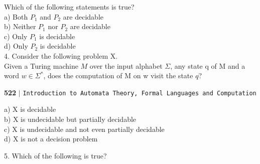 \documentclass[11pt]{article}
\begin{document}
\vspace*{0.1cm}
\hspace*{0.5cm} Which of the following statements is true?\\

\vspace*{0.1cm}
\hspace*{0.5cm} a) Both $P _{1}$ and $P _{2}$ are decidable\\
\hspace*{0.5cm} b) Neither $P _{1}$ nor $P _{2}$ are decidable\\
\hspace*{0.5cm} c) Only $P _{1}$ is decidable\\
\hspace*{0.5cm} d) Only $P _{2}$ is decidable\\

\vspace*{0.2cm}
\hspace*{-0.4cm}
4. Consider the following problem X.\\
\hspace*{0.5cm} Given a Turing machine $M$ over the input alphabet $\Sigma$, any state q of M and a word $w \in \Sigma ^{*}$, does
the computation of M on w visit the state $q$?\\

\newpage
\begin{flushleft}
    \textbf{522}\hspace*{0.1cm} \textbf{$|$} \hspace*{0.1cm} \texttt{Introduction to Automata Theory, Formal Languages and Computation}
  \end{flushleft}
  \vspace*{0.5cm}

\hspace*{0.5cm} a) X is decidable\\
\hspace*{0.5cm} b) X is undecidable but partially decidable\\
\hspace*{0.5cm} c) X is undecidable and not even partially decidable\\
\hspace*{0.5cm} d) X is not a decision problem\\
\vspace*{0.2cm}

\hspace*{-0.4cm}
5. Which of the following is true?\\
\vspace*{0.1cm}
\end{document}
